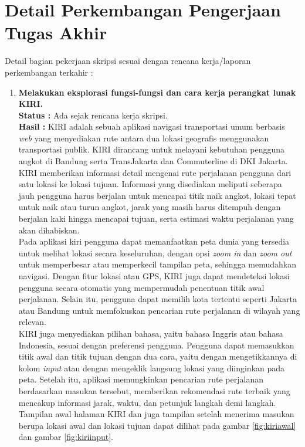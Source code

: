 \documentclass[a4paper,twoside]{article}
\begin{document}
\section{Detail Perkembangan Pengerjaan Tugas Akhir}
Detail bagian pekerjaan skripsi sesuai dengan rencana kerja/laporan perkembangan terkahir :
	\begin{enumerate}
		\item \textbf{Melakukan eksplorasi fungsi-fungsi dan cara kerja perangkat lunak KIRI.}\\
		{\bf Status :} Ada sejak rencana kerja skripsi.\\
		{\bf Hasil :} KIRI adalah sebuah aplikasi navigasi transportasi umum berbasis \textit{web} yang menyediakan rute antara dua lokasi geografis menggunakan transportasi publik. KIRI dirancang untuk melayani kebutuhan pengguna angkot di Bandung serta TransJakarta dan Commuterline di DKI Jakarta.
        \\ KIRI memberikan informasi detail mengenai rute perjalanan pengguna dari satu lokasi ke lokasi tujuan. Informasi yang disediakan meliputi seberapa jauh pengguna harus berjalan untuk mencapai titik naik angkot, lokasi tepat untuk naik atau turun angkot, jarak yang masih harus ditempuh dengan berjalan kaki hingga mencapai tujuan, serta estimasi waktu perjalanan yang akan dihabiskan.
        \\ Pada aplikasi kiri pengguna dapat memanfaatkan peta dunia yang tersedia untuk melihat lokasi secara keseluruhan, dengan opsi \textit{zoom in} dan \textit{zoom out} untuk memperbesar atau memperkecil tampilan peta, sehingga memudahkan navigasi. Dengan fitur lokasi atau GPS, KIRI juga dapat mendeteksi lokasi pengguna secara otomatis yang mempermudah penentuan titik awal perjalanan. Selain itu, pengguna dapat memilih kota tertentu seperti Jakarta atau Bandung untuk memfokuskan pencarian rute perjalanan di wilayah yang relevan.
        \\ KIRI juga menyediakan pilihan bahasa, yaitu bahasa Inggris atau bahasa Indonesia, sesuai dengan preferensi pengguna. Pengguna dapat memasukkan titik awal dan titik tujuan dengan dua cara, yaitu dengan mengetikkannya di kolom \textit{input} atau dengan mengeklik langsung lokasi yang diinginkan pada peta. Setelah itu, aplikasi memungkinkan pencarian rute perjalanan berdasarkan masukan tersebut, memberikan rekomendasi rute terbaik yang mencakup informasi jarak, waktu, dan petunjuk langkah demi langkah. Tampilan awal halaman KIRI dan juga tampilan setelah menerima masukan berupa lokasi awal dan lokasi tujuan dapat dilihat pada gambar \ref{fig:kiriawal} dan gambar \ref{fig:kiriinput}.

\end{enumerate}
\end{document}
